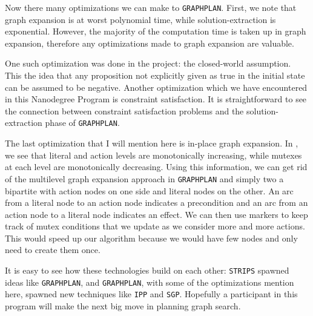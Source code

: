 \documentclass{article}
\newcommand{\GRAPHPLAN}{\texttt{GRAPHPLAN}}
\newcommand{\STRIPS}{\texttt{STRIPS}}
\begin{document}
Now there many optimizations we can make to \GRAPHPLAN{}. First, we note that graph expansion is at worst polynomial time, while solution-extraction is exponential\cite{BlumFurst}. However, the majority of the computation time is taken up in graph expansion, therefore any optimizations made to graph expansion are valuable\cite{Weld1999}.

One such optimization was done in the project: the closed-world assumption. This the idea that any proposition not explicitly given as true in the initial state can be assumed to be negative. Another optimization which we have encountered in this Nanodegree Program is constraint satisfaction. It is straightforward to see the connection between constraint satisfaction problems and the solution-extraction phase of \GRAPHPLAN{}\cite{Weld1999}.

The last optimization that I will mention here is in-place graph expansion. In \cite{Weld1999}, we see that literal and action levels are monotonically increasing, while mutexes at each level are monotonically decreasing. Using this information, we can get rid of the multilevel graph expansion approach in \GRAPHPLAN{} and simply two a bipartite with action nodes on one side and literal nodes on the other. An arc from a literal node to an action node indicates a precondition and an arc from an action node to a literal node indicates an effect. We can then use markers to keep track of mutex conditions that we update as we consider more and more actions. This would speed up our algorithm because we would have few nodes and only need to create them once.

It is easy to see how these technologies build on each other: \STRIPS{} spawned ideas like \GRAPHPLAN{}, and \GRAPHPLAN{}, with some of the optimizations mention here, spawned new techniques like \texttt{IPP}\cite{Koehler} and \texttt{SGP}\cite{AndersonSmith}. Hopefully a participant in this program will make the next big move in planning graph search.



\end{document}
